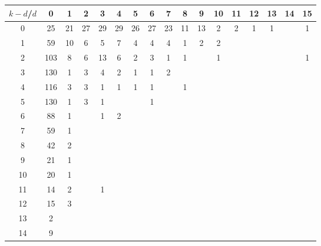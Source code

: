 \documentclass{article}[12pt]
\begin{document}
\begin{landscape}

\begin{table}[h]\footnotesize
{\centering
\begin{tabular}{|c|c|
c|c|c|c|c|c|c|c|c|c|c|c|c|c|c|}
  \hline
  $k-d$/$d$ 
 & 0 & 1 & 2 & 3 & 4 & 5 & 6 & 7 & 8 & 9 & 10 & 11 & 12 & 13 & 14 & 15\\

  \hline
  \hline

0  & 25 & 21 & 27 & 29 & 29 & 26 & 27 & 23 & 11 & 13 & 2 & 2 & 1 & 1 &  & 1\\

1  & 59 & 10 & 6 & 5 & 7 & 4 & 4 & 4 & 1 & 2 & 2 &  &  &  &  & \\

2  & 103 & 8 & 6 & 13 & 6 & 2 & 3 & 1 & 1 &  & 1 &  &  &  &  & 1\\

3  & 130 & 1 & 3 & 4 & 2 & 1 & 1 & 2 &  &  &  &  &  &  &  & \\

4  & 116 & 3 & 3 & 1 & 1 & 1 & 1 &  & 1 &  &  &  &  &  &  & \\

5  & 130 & 1 & 3 & 1 &  &  & 1 &  &  &  &  &  &  &  &  & \\

6  & 88 & 1 &  & 1 & 2 &  &  &  &  &  &  &  &  &  &  & \\

7  & 59 & 1 &  &  &  &  &  &  &  &  &  &  &  &  &  & \\

8  & 42 & 2 &  &  &  &  &  &  &  &  &  &  &  &  &  & \\

9  & 21 & 1 &  &  &  &  &  &  &  &  &  &  &  &  &  & \\

10  & 20 & 1 &  &  &  &  &  &  &  &  &  &  &  &  &  & \\

11  & 14 & 2 &  & 1 &  &  &  &  &  &  &  &  &  &  &  & \\

12  & 15 & 3 &  &  &  &  &  &  &  &  &  &  &  &  &  & \\

13  & 2 &  &  &  &  &  &  &  &  &  &  &  &  &  &  & \\

14  & 9 &  &  &  &  &  &  &  &  &  &  &  &  &  &  & \\


\end{tabular}}
\end{table}
\end{landscape}
\end{document}
